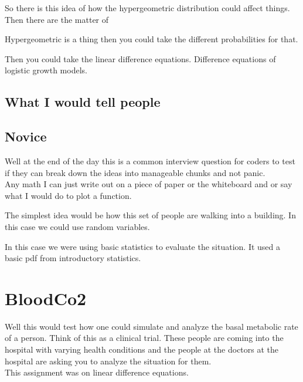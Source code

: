 So there is this idea of how the hypergeometric distribution could affect things. Then there are the matter of 

        
Hypergeometric is a thing then you could take the different probabilities for that.  

Then you could take the linear difference equations. Difference equations of logistic growth models. 




\subsection{What I would tell people}

\subsection{Novice}


Well at the end of the day this is a common interview question for coders to test if they can break down the ideas into manageable chunks and not panic. \\

Any math I can just write out on a piece of paper or the whiteboard and or say what I would do to plot a function. 

The simplest idea would be how this set of people are walking into a building. In this case we could use random variables. 

In this case we were using basic statistics to evaluate the situation. It used a basic pdf from introductory statistics. \\ 






\section{BloodCo2}

Well this would test how one could simulate and analyze the basal metabolic rate of a person. Think of this as a clinical trial. These people are coming into the hospital with varying health conditions and the people at the doctors at the hospital are asking you to analyze the situation for them. \\ 

This assignment was on linear difference equations. \\ 

